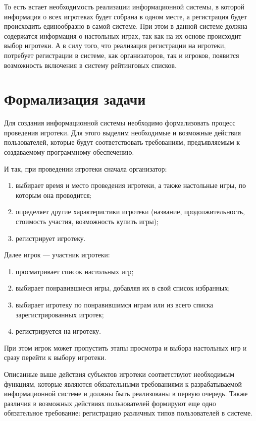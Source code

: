 То есть встает необходимость реализации информационной системы, в которой
информация о всех игротеках будет собрана в одном месте, а регистрация будет
происходить единообразно в самой системе. При этом в данной системе должна
содержатся информация о настольных играх, так как на их основе происходит выбор
игротеки. А в силу того, что реализация регистрации на игротеки, потребует
регистрации в системе, как организаторов, так и игроков, появится возможность
включения в систему рейтинговых списков.

\section{Формализация задачи}

Для создания информационной системы необходимо формализовать процесс проведения
игротеки. Для этого выделим необходимые и возможные действия пользователей,
которые будут соответствовать требованиям, предъявляемым к
создаваемому программному обеспечению.

И так, при проведении игротеки сначала организатор:
\begin{enumerate}[label=\arabic*)]
    \item выбирает время и место проведения игротеки, а также настольные игры,
      по которым она проводится;
    \item определяет другие характеристики игротеки (название,
        продолжительность, стоимость участия, возможность купить игры);
    \item регистрирует игротеку.
\end{enumerate}

Далее игрок --- участник игротеки:
\begin{enumerate}[label=\arabic*)]
    \item просматривает список настольных игр;
    \item выбирает понравившиеся игры, добавляя их в свой список избранных;
    \item выбирает игротеку по понравившимся играм или из всего списка
        зарегистрированных игротек;
    \item регистрируется на игротеку.
\end{enumerate}

При этом игрок может пропустить этапы просмотра и выбора настольных игр и
сразу перейти к выбору игротеки.

Описанные выше действия субъектов игротеки соответствуют необходимым функциям,
которые являются обязательными требованиями к разрабатываемой информационной
системе и должны быть реализованы в первую очередь. Также различия в возможных
действиях пользователей формируют еще одно обязательное требование: регистрацию
различных типов пользователей в системе.

